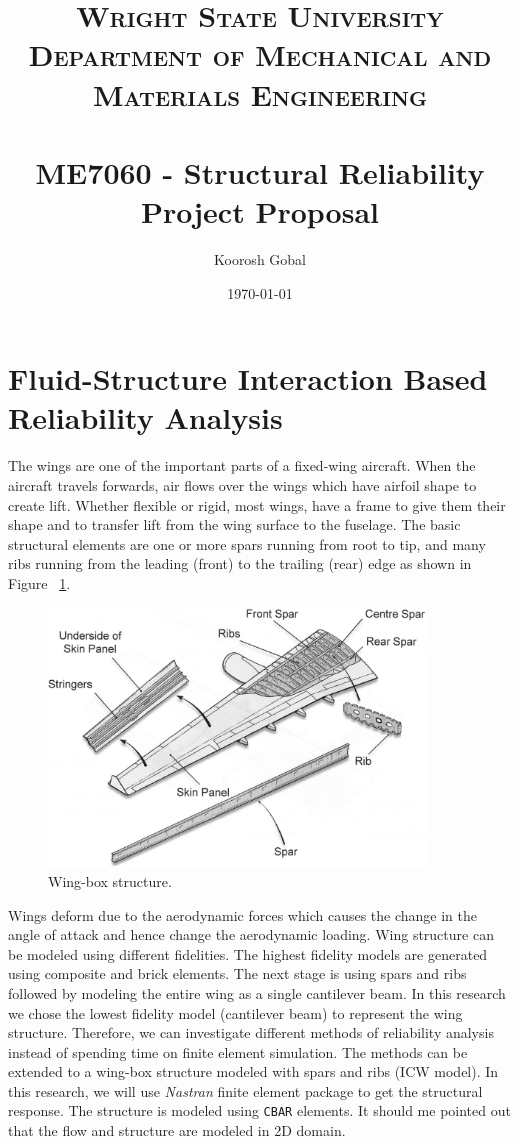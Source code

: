 \documentclass[paper=a4, fontsize=12pt]{scrartcl} %
\title{	
\normalfont \normalsize 
\textsc{Wright State University\\ Department of Mechanical and Materials Engineering} \\ [25pt] %
\horrule{0.5pt} \\[0.4cm] %
\huge ME7060 - Structural Reliability \\ %
\LARGE Project Proposal
\horrule{2pt} \\[0.5cm] %
}
\author{Koorosh Gobal} %
\date{\normalsize\today} %
\begin{document}
\maketitle %

\section*{Fluid-Structure Interaction Based Reliability Analysis}
The wings are one of the important parts of a fixed-wing aircraft. When the aircraft travels forwards, air flows over the wings which have airfoil shape to create lift. Whether flexible or rigid, most wings, have a frame to give them their shape and to transfer lift from the wing surface to the fuselage. The basic structural elements are one or more spars running from root to tip, and many ribs running from the leading (front) to the trailing (rear) edge as shown in Figure ~\ref{fig:wing_box}.
%
\begin{figure}[H]
	\centering
    \includegraphics[width=10cm]{wing_box.jpg}
    \caption{Wing-box structure.}
    \label{fig:wing_box}
\end{figure}
%
Wings deform due to the aerodynamic forces which causes the change in the angle of attack and hence change the aerodynamic loading. Wing structure can be modeled using different fidelities. The highest fidelity models are generated using composite and brick elements. The next stage is using spars and ribs followed by modeling the entire wing as a single cantilever beam. In this research we chose the lowest fidelity model (cantilever beam) to represent the wing structure. Therefore, we can investigate different methods of reliability analysis instead of spending time on finite element simulation. The methods can be extended to a wing-box structure modeled with spars and ribs (ICW model). In this research, we will use \emph{Nastran} finite element package to get the structural response. The structure is modeled using \texttt{CBAR} elements. It should me pointed out that the flow and structure are modeled in 2D domain.
\end{document}
